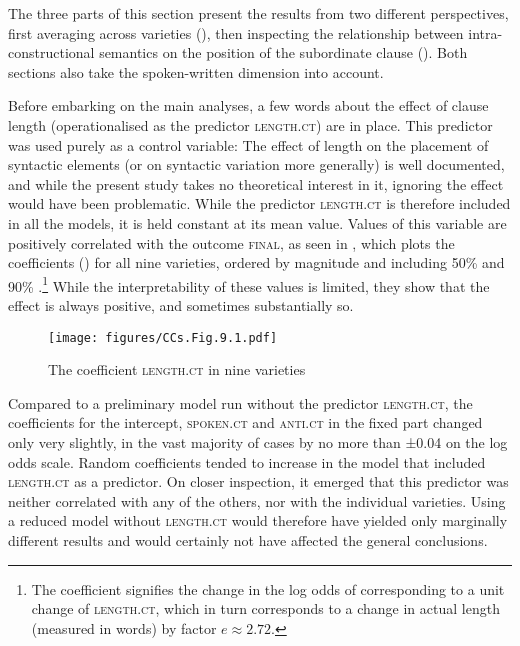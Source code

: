 The three parts of this section present the results from two different perspectives, first averaging across varieties (), then inspecting the relationship between intra-constructional semantics on the position of the subordinate clause (). Both sections also take the spoken-written dimension into account.

Before embarking on the main analyses, a few words about the effect of clause length (operationalised as the predictor \textsc{length.ct}) are in place. This predictor was used purely as a control variable: The effect of length on the placement of syntactic elements (or on syntactic variation more generally) is well documented, and while the present study takes no theoretical interest in it, ignoring the effect would have been problematic. While the predictor \textsc{length.ct} is therefore included in all the models, it is held constant at its mean value. Values of this variable are positively correlated with the outcome \textsc{final}, as seen in , which plots the coefficients () for all nine varieties, ordered by magnitude and including 50\% and 90\% .\footnote{The coefficient signifies the change in the log odds of  corresponding to a unit change of \textsc{length.ct}, which in turn corresponds to a change in actual length (measured in words) by factor $e \approx 2.72$.}  While the interpretability of these values is limited, they show that the effect is always positive, and sometimes substantially so.

\begin{figure}
\texttt{[image: figures/CCs.Fig.9.1.pdf]}
\caption{\label{bkm:Ref62285257}\label{fig:9.1}The coefficient \textsc{length.ct} in nine varieties}
\end{figure}

Compared to a preliminary model run without the predictor \textsc{length.ct}, the coefficients for the intercept, \textsc{spoken.ct} and \textsc{anti.ct} in the fixed part changed only very slightly, in the vast majority of cases by no more than ±0.04 on the log odds scale. Random coefficients tended to increase in the model that included \textsc{length.ct} as a predictor. On closer inspection, it emerged that this predictor was neither correlated with any of the others, nor with the individual varieties. Using a reduced model without \textsc{length.ct} would therefore have yielded only marginally different results and would certainly not have affected the general conclusions.

